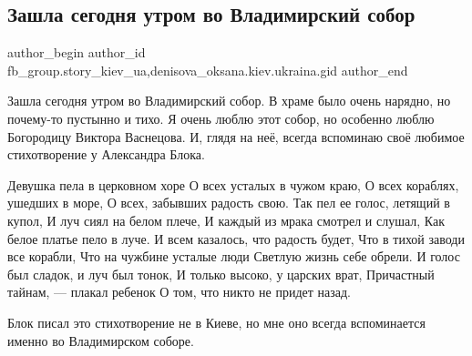  
 
 
 
 
 
\subsection{Зашла сегодня утром во Владимирский собор}
\label{sec:06_01_2022.fb.fb_group.story_kiev_ua.1.vladimirskij_sobor}
 
\ifcmt
 author_begin
   author_id fb_group.story_kiev_ua,denisova_oksana.kiev.ukraina.gid
 author_end
\fi

Зашла сегодня утром во Владимирский собор. В храме было очень нарядно, но
почему-то пустынно и тихо. Я очень люблю этот собор, но особенно люблю
Богородицу Виктора Васнецова. И, глядя на неё, всегда вспоминаю своё любимое
стихотворение у Александра Блока.


\raggedcolumns
\begin{multicols}{2} %
\setlength{\parindent}{0pt}

\obeycr
Девушка пела в церковном хоре
О всех усталых в чужом краю,
О всех кораблях, ушедших в море,
О всех, забывших радость свою.
\smallskip
Так пел ее голос, летящий в купол,
И луч сиял на белом плече,
И каждый из мрака смотрел и слушал,
Как белое платье пело в луче.
\smallskip
И всем казалось, что радость будет,
Что в тихой заводи все корабли,
Что на чужбине усталые люди
Светлую жизнь себе обрели.
\smallskip
И голос был сладок, и луч был тонок,
И только высоко, у царских врат,
Причастный тайнам, — плакал ребенок
О том, что никто не придет назад.
\restorecr
\end{multicols} %

Блок писал это стихотворение не в Киеве, но мне оно всегда вспоминается именно
во Владимирском соборе.

